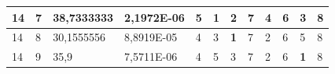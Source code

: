 \documentclass[conference]{IEEEtran}
\begin{document}
\begin{table}[]
\begin{tabular}{|llll|llllllll|}
\multicolumn{1}{|l|}{14}                                                    & \multicolumn{1}{l|}{7}                                                        & \multicolumn{1}{l|}{38,7333333}                                                   & 2,1972E-06                     & \multicolumn{1}{l|}{5}                                                  & \multicolumn{1}{l|}{\textbf{1}}                                         & \multicolumn{1}{l|}{2}                                                  & \multicolumn{1}{l|}{7}                                                  & \multicolumn{1}{l|}{4}                                                  & \multicolumn{1}{l|}{6}                                                  & \multicolumn{1}{l|}{3}                                                  & 8                          \\ \hline
\multicolumn{1}{|l|}{14}                                                    & \multicolumn{1}{l|}{8}                                                        & \multicolumn{1}{l|}{30,1555556}                                                   & 8,8919E-05                     & \multicolumn{1}{l|}{4}                                                  & \multicolumn{1}{l|}{3}                                                  & \multicolumn{1}{l|}{\textbf{1}}                                         & \multicolumn{1}{l|}{7}                                                  & \multicolumn{1}{l|}{2}                                                  & \multicolumn{1}{l|}{6}                                                  & \multicolumn{1}{l|}{5}                                                  & 8                          \\ \hline
\multicolumn{1}{|l|}{14}                                                    & \multicolumn{1}{l|}{9}                                                        & \multicolumn{1}{l|}{35,9}                                                         & 7,5711E-06                     & \multicolumn{1}{l|}{4}                                                  & \multicolumn{1}{l|}{5}                                                  & \multicolumn{1}{l|}{3}                                                  & \multicolumn{1}{l|}{7}                                                  & \multicolumn{1}{l|}{2}                                                  & \multicolumn{1}{l|}{6}                                                  & \multicolumn{1}{l|}{\textbf{1}}                                         & 8                          \\ \hline

\end{tabular}
\end{table}
\end{document}

